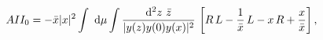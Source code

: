 \begin{equation}
  AII_0 = -\bar x|x|^2 \int\ {\rm d}\mu\int {{\rm d}^2z~\bar z\over
|y(z)y(0)y(x)|^2}\, \left[ R\, L-{1\over \bar x}\, L-x\, R+{x\over
\bar x}\right] ,
\end{equation}

